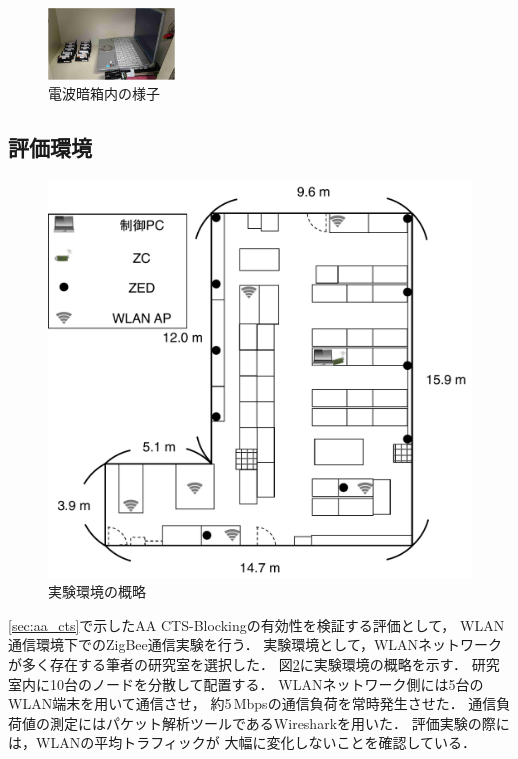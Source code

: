 \documentclass[technicalreport]{ieicej}
\begin{document}
\begin{figure}[bt]
 \centering
 \includegraphics[width=0.3\textwidth]{figure/nowave_box.pdf}
 \caption{電波暗箱内の様子}
 \label{fig:nowave_box}
\end{figure}

\subsection{評価環境}

\begin{figure}[bt]
 \centering
 \includegraphics[width=\columnwidth]{figure/fukuda_lab.pdf}
 \caption{実験環境の概略}
 \label{fig:fukuda_lab}
\end{figure}

\ref{sec:aa_cts}で示したAA CTS-Blockingの有効性を検証する評価として，
WLAN通信環境下でのZigBee通信実験を行う．
実験環境として，WLANネットワークが多く存在する筆者の研究室を選択した．
図\ref{fig:fukuda_lab}に実験環境の概略を示す．
研究室内に10台のノードを分散して配置する．
WLANネットワーク側には5台のWLAN端末を用いて通信させ，
約5\,Mbpsの通信負荷を常時発生させた．
通信負荷値の測定にはパケット解析ツールであるWiresharkを用いた．
評価実験の際には，WLANの平均トラフィックが
大幅に変化しないことを確認している．
\end{document}
